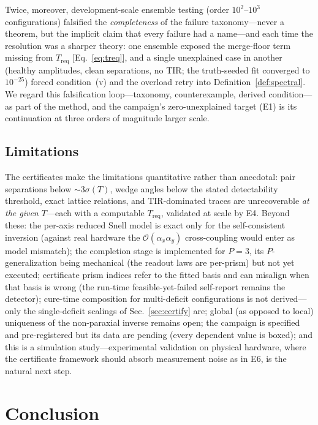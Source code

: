 \documentclass[twocolumn,preprintnumbers,amsmath,amssymb,pra,floatfix]{revtex4-2}
\newcommand{\bigO}{\mathcal{O}}
\begin{document}
Twice, moreover, development-scale ensemble testing (order
$10^{2}$--$10^{3}$ configurations) falsified the \emph{completeness}
of the failure taxonomy---never a theorem, but the implicit claim
that every failure had a name---and each time the resolution was a
sharper theory: one ensemble exposed the merge-floor term missing
from $T_{\mathrm{req}}$ [Eq.~\eqref{eq:treq}], and a single
unexplained case in another (healthy amplitudes, clean separations,
no TIR; the truth-seeded fit converged to $10^{-25}$) forced
condition~(v) and the overload retry into
Definition~\ref{def:spectral}.  We regard this falsification
loop---taxonomy, counterexample, derived condition---as part of the
method, and the campaign's zero-unexplained target (E1) is its
continuation at three orders of magnitude larger scale.

\subsection{Limitations}

The certificates make the limitations quantitative rather than
anecdotal: pair separations below $\sim\!3\sigma(T)$, wedge angles
below the stated detectability threshold, exact lattice relations, and
TIR-dominated traces are unrecoverable \emph{at the given $T$}---each
with a computable $T_{\mathrm{req}}$, validated at scale by E4.
Beyond these: the per-axis reduced Snell model is exact only for
the self-consistent inversion (against real hardware the
$\bigO(\alpha_x\alpha_y)$ cross-coupling would enter as model
mismatch); the completion stage is implemented for $P{=}3$, its
$P$-generalization being mechanical (the readout laws are per-prism)
but not yet executed; certificate prism indices refer to the fitted
basis and can misalign when that basis is wrong (the run-time
feasible-yet-failed self-report remains the detector); cure-time
composition for multi-deficit configurations is not derived---only
the single-deficit scalings of Sec.~\ref{sec:certify} are; global
(as opposed to local) uniqueness of the non-paraxial inverse remains
open; the campaign is specified and pre-registered but its data are
pending (every dependent value is boxed); and this is a simulation
study---experimental validation on physical hardware, where the
certificate framework should absorb measurement noise as in E6, is
the natural next step.

\section{Conclusion}
\label{sec:conclusion}
\end{document}
